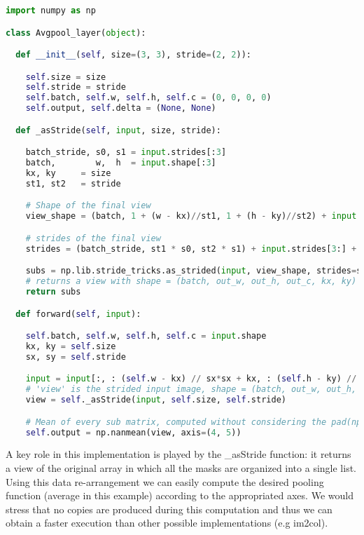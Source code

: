 \documentclass{standalone}
\begin{document}
\lstset{style=snippet}
\begin{lstlisting}[language=Python, caption=NumPyNet version of AvgPool function, label=code:py_avgpool]
import numpy as np

class Avgpool_layer(object):

  def __init__(self, size=(3, 3), stride=(2, 2)):

    self.size = size
    self.stride = stride
    self.batch, self.w, self.h, self.c = (0, 0, 0, 0)
    self.output, self.delta = (None, None)

  def _asStride(self, input, size, stride):

    batch_stride, s0, s1 = input.strides[:3]
    batch,        w,  h  = input.shape[:3]
    kx, ky     = size
    st1, st2   = stride

    # Shape of the final view
    view_shape = (batch, 1 + (w - kx)//st1, 1 + (h - ky)//st2) + input.shape[3:] + (kx, ky)

    # strides of the final view
    strides = (batch_stride, st1 * s0, st2 * s1) + input.strides[3:] + (s0, s1)

    subs = np.lib.stride_tricks.as_strided(input, view_shape, strides=strides)
    # returns a view with shape = (batch, out_w, out_h, out_c, kx, ky)
    return subs

  def forward(self, input):

    self.batch, self.w, self.h, self.c = input.shape
    kx, ky = self.size
    sx, sy = self.stride

    input = input[:, : (self.w - kx) // sx*sx + kx, : (self.h - ky) // sy*sy + ky, ...]
    # 'view' is the strided input image, shape = (batch, out_w, out_h, out_c, kx, ky)
    view = self._asStride(input, self.size, self.stride)

    # Mean of every sub matrix, computed without considering the pad(np.nan)
    self.output = np.nanmean(view, axis=(4, 5))

\end{lstlisting}

A key role in this implementation is played by the \textsf{\_asStride} function: it returns a view of the original array in which all the masks are organized into a single list.
Using this data re-arrangement we can easily compute the desired pooling function (average in this example) according to the appropriated axes.
We would stress that no copies are produced during this computation and thus we can obtain a faster execution than other possible implementations (e.g \textsf{im2col}).
\end{document}
